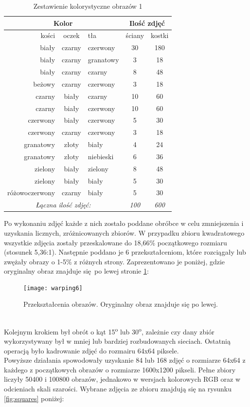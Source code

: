 \begin{table}[h!]
\centering
\begin{tabular}{rcl|cc}
\multicolumn{3}{c}{Kolor} & \multicolumn{2}{c}{Ilość zdjęć} \\ \hline
kości & oczek & tła & ściany & kostki \\ \hline
biały & czarny & czerwony & 30 & 180 \\
biały & czarny & granatowy & 3 & 18 \\
biały & czarny & czarny & 8 & 48 \\
beżowy & czarny & czerwony & 3 & 18 \\
czarny & biały & czarny & 10 & 60 \\
czarny & biały & czerwony & 10 & 60 \\
czerwony & biały & czerwony & 5 & 30 \\
czerwony & czarny & czerwony & 3 & 18 \\
granatowy & złoty & biały & 4 & 24 \\
granatowy & złoty & niebieski & 6 & 36 \\
zielony & biały & zielony & 8 & 48 \\
zielony & biały & biały & 5 & 30 \\
różowoczerwony & czarny & biały & 5 & 30 \\ \hline
\multicolumn{3}{c}{\textit{Łączna ilość zdjęć:}} & \textit{100} & \textit{600}
\end{tabular}
\vspace{0.2cm}
\caption{Zestawienie kolorystyczne obrazów 1}
\label{tab:zestawienie1}
\end{table}
Po wykonaniu zdjęć każde z nich zostało poddane obróbce w celu zmniejszenia i uzyskania licznych,
zróżnicowanych zbiorów. W przypadku zbioru kwadratowego wszystkie zdjęcia zostały przeskalowane
do 18,66\% początkowego rozmiaru (stosunek 5,36:1). Następnie poddano je 6 przekształceniom, które
rozciągały lub zwężały obrazy o 1-5\% z różnych strony. Zaprezentowano je poniżej, gdzie oryginalny
obraz znajduje się po lewej stronie \ref{fig:warping6}:
\begin{figure}[h!]
\centering
\texttt{[image: warping6]}
\caption{Przekształcenia obrazów. Oryginalny obraz znajduje się po lewej.}
\label{fig:warping6}
\end{figure}\\
Kolejnym krokiem był obrót o kąt
15\textsuperscript{o} lub 30\textsuperscript{o}, zależnie czy dany zbiór wykorzystywany był w mniej
lub bardziej rozbudowanych sieciach. Ostatnią operacją było kadrowanie zdjęć do rozmairu 64x64 piksele.\\
Powyższe działania spowodowały uzyskanie 84 lub 168 zdjęć o rozmiarze 64x64 z każdego
z początkowych obrazów o rozmiarze 1600x1200 pikseli. Pełne zbiory liczyły 50400 i 100800
obrazów, jednakowo w wersjach kolorowych RGB oraz w odcieniach skali szarości.
Wybrane zdjęcia ze zbioru znajdują się na rysunku \ref{fig:squares} poniżej: \newpage

